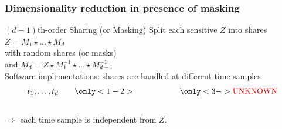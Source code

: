 \begin{frame}
\frametitle{Dimensionality reduction in presence of masking}
\begin{block}{$(d-1)$th-order Sharing (or Masking)} 
Split each sensitive $Z$ into shares  $Z = M_1 \star \dots \star M_d$ \\
with  random shares (or masks)  \\ and $M_d = Z \star M_1^{-1}\star \dots \star M_{d-1}^{-1}$ \\
Software implementations: shares are handled at different time samples $$t_1,\dots, t_d \qquad \only<1-2>{\mbox{\textcolor{white}{UNKNOWN}}} \only<3->{\mbox{\textcolor{red}{UNKNOWN}}} $$\\
$\Rightarrow$ each time sample is independent from $Z$.\\
\end{block}
\end{frame}



